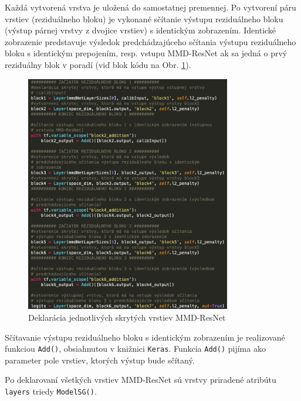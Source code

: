 Každá vytvorená vrstva je uložená do samostatnej premennej. Po vytvorení páru vrstiev (reziduálneho bloku) je vykonané sčítanie výstupu reziduálneho bloku (výstup párnej vrstvy z dvojice vrstiev) s identickým zobrazením. Identické zobrazenie predstavuje výsledok predchádzajúceho sčítania výstupu reziduálneho bloku s identickým prepojením, resp. vstupu MMD-ResNet ak sa jedná o prvý reziduálny blok v poradí (viď blok kódu na Obr. \ref{kod_vrstvy}). 

\begin{figure}
\centerline{\includegraphics[width=0.8\textwidth]{images/kod.png}}
\caption[Deklarácia skrytých vrstiev MMD-ResNet]{Deklarácia jednotlivých skrytých vrstiev MMD-ResNet}
\label{kod_vrstvy}
\end{figure}

Sčítavanie výstupu reziduálneho bloku s identickým zobrazením je realizované funkciou \texttt{Add()}, obsiahnutou v knižnici \texttt{Keras}. Funkcia \texttt{Add()} pijíma ako parameter pole vrstiev, ktorých výstup bude sčítaný.

Po deklarovaní všetkých vrstiev MMD-ResNet sú vrstvy priradené atribútu \texttt{layers} triedy \texttt{ModelSG()}.

